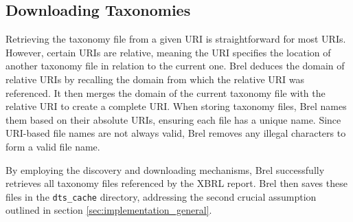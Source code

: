 
\subsection{Downloading Taxonomies}

Retrieving the taxonomy file from a given URI is straightforward for most URIs.
However, certain URIs are relative,
meaning the URI specifies the location of another taxonomy file in relation to the current one\cite{w3_relative_uri}.
Brel deduces the domain of relative URIs by recalling the domain from which the relative URI was referenced.
It then merges the domain of the current taxonomy file with the relative URI to create a complete URI.
When storing taxonomy files, Brel names them based on their absolute URIs, ensuring each file has a unique name.
Since URI-based file names are not always valid, Brel removes any illegal characters to form a valid file name.

By employing the discovery and downloading mechanisms,
Brel successfully retrieves all taxonomy files referenced by the XBRL report.
Brel then saves these files in the \texttt{dts\_cache} directory,
addressing the second crucial assumption outlined in section \ref{sec:implementation_general}.

